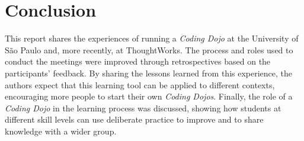 \section{Conclusion}\label{sec:conclusion}

This report shares the experiences of running a \emph{Coding Dojo} at the University of São Paulo and, more
recently, at ThoughtWorks. The process and roles used to conduct the meetings were improved through
retrospectives based on the participants' feedback. By sharing the lessons learned from this experience, the
authors expect that this learning tool can be applied to different contexts, encouraging more people to
start their own \emph{Coding Dojos}. Finally, the role of a \emph{Coding Dojo} in the learning process
was discussed, showing how students at different skill levels can use deliberate practice to improve and to
share knowledge with a wider group.